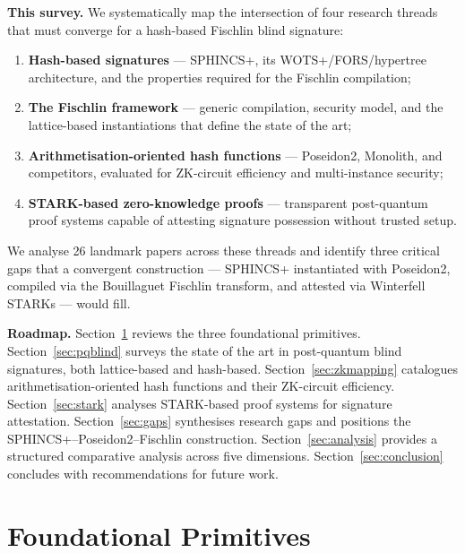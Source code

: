 \documentclass[11pt,a4paper]{article}
\begin{document}
\medskip
\noindent\textbf{This survey.}
We systematically map the intersection of four research threads that must converge for a
hash-based Fischlin blind signature:

\begin{enumerate}
  \item \textbf{Hash-based signatures} --- SPHINCS+, its WOTS+/FORS/hypertree architecture,
        and the properties required for the Fischlin compilation;
  \item \textbf{The Fischlin framework} --- generic compilation, security model, and the
        lattice-based instantiations that define the state of the art;
  \item \textbf{Arithmetisation-oriented hash functions} --- Poseidon2, Monolith, and
        competitors, evaluated for ZK-circuit efficiency and multi-instance security;
  \item \textbf{STARK-based zero-knowledge proofs} --- transparent post-quantum proof systems
        capable of attesting signature possession without trusted setup.
\end{enumerate}

We analyse 26 landmark papers across these threads and identify three critical gaps that a
convergent construction --- SPHINCS+ instantiated with Poseidon2, compiled via the Bouillaguet
Fischlin transform, and attested via Winterfell STARKs --- would fill.

\medskip
\noindent\textbf{Roadmap.}  Section~\ref{sec:prelim} reviews the three foundational primitives.
Section~\ref{sec:pqblind} surveys the state of the art in post-quantum blind signatures, both
lattice-based and hash-based.  Section~\ref{sec:zkmapping} catalogues arithmetisation-oriented
hash functions and their ZK-circuit efficiency.  Section~\ref{sec:stark} analyses STARK-based
proof systems for signature attestation.  Section~\ref{sec:gaps} synthesises research gaps and
positions the SPHINCS+--Poseidon2--Fischlin construction.  Section~\ref{sec:analysis} provides
a structured comparative analysis across five dimensions.  Section~\ref{sec:conclusion}
concludes with recommendations for future work.

\section{Foundational Primitives}
\label{sec:prelim}
\end{document}
